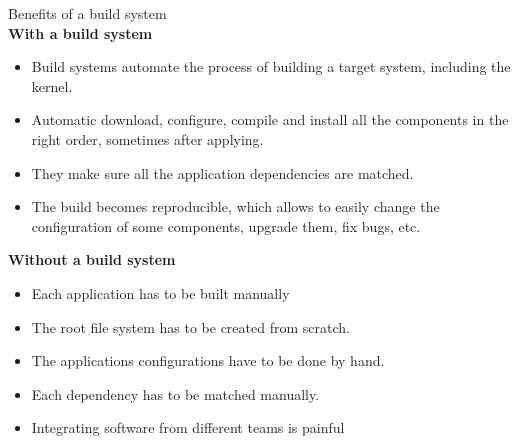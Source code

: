 \begin{theorem}{Benefits of a build system}\\
\textbf{With a build system}
\begin{itemize}
    \item Build systems automate the process of building a target system, including the kernel.
    \item Automatic download, configure, compile and install all the components in the right order, sometimes after applying.
    \item They make sure all the application dependencies are matched.
    \item The build becomes reproducible, which allows to easily change the configuration of some components, upgrade them, fix bugs, etc.
\end{itemize}

\textbf{Without a build system}
    \begin{itemize}
        \item Each application has to be built manually
        \item The root file system has to be created from scratch.
        \item The applications configurations have to be done by hand.
        \item Each dependency has to be matched manually.
        \item Integrating software from different teams is painful 
    \end{itemize}
\end{theorem}

